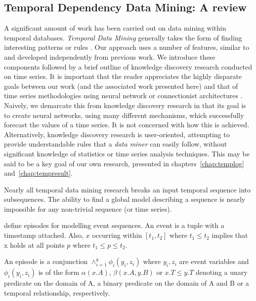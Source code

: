 \subsection{Temporal Dependency Data Mining: A review}\label{subsec:temp_mine}

A significant amount of work has been carried out on data mining
within temporal databases. {\em Temporal Data Mining} generally takes
the form of finding interesting patterns \cite{bt98} or rules
\cite{dlm98,mt96}. Our approach uses a number of features, similar to
and developed independently from
previous work. We introduce these components followed by a brief
outline of knowledge discovery research conducted on time series. It
is important that the reader appreciates the highly disparate goals
between our work (and the associated work presented here) and that of
time series methodologies using neural network or connectionist architectures
\cite{wg94,fc95}. Naively, we demarcate this from knowledge discovery
research in that its goal is to create neural networks, using many
different mechanisms, which successfully forecast the values of a time
series. It is not concerned with how this is achieved. Alternatively,
knowledge discovery research is user-oriented, attempting to provide
understandable rules that a {\em data miner} can easily follow,
without significant knowledge of statistics or time series analysis
techniques. This may be said to be a key goal of our own research,
presented in chapters~\ref{chap:templog} and~\ref{chap:tempresult}.

\medskip

Nearly all temporal data mining research breaks an input temporal sequence into
subsequences. The ability to find a global model describing a sequence
is nearly impossible \cite{end95} for any non-trivial sequence (or
time series).

\medskip

\cite{mtv95,mt96,mt96b} define episodes for modelling event
sequences. An event is a tuple with a timestamp attached. Also, $x$
occurring within $[ t_1, t_2 ]$ where $t_1 \le t_2$ implies that x
holds at all points $p$ where $t_1 \le p \le t_2$.

\begin{definition}[Episode]
\begin{rm}
An episode is a conjunction $\wedge_{i=1}^k \phi_i (y_i,z_i)$ where
$y_i,z_i$ are event variables and $\phi_i (y_i,z_i)$ is of the form
$\alpha(x.A)$, $\beta(x.A,y.B)$ or $x.T \le y.T$ denoting a unary
predicate on the domain of A, a binary predicate on the domain of A
and B or a temporal relationship, respectively.
\end{rm}
\end{definition}


